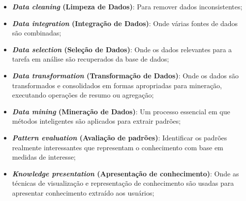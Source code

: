 \begin{itemize}
    \item \textbf{\textit{Data cleaning} (Limpeza de Dados)}: Para remover dados inconsistentes;

    \item \textbf{\textit{Data integration} (Integração de Dados)}: Onde várias fontes de dados são combinadas;

    \item \textbf{\textit{Data selection} (Seleção de Dados)}: Onde os dados relevantes para a tarefa em análise são recuperados da base de dados;

    \item \textbf{\textit{Data transformation} (Transformação de Dados)}: Onde os dados são transformados e consolidados em formas apropriadas para mineração, executando operações de resumo ou agregação;

    \item \textbf{\textit{Data mining} (Mineração de Dados)}: Um processo essencial em que métodos inteligentes são aplicados para extrair padrões;

    \item \textbf{\textit{Pattern evaluation} (Avaliação de padrões)}: Identificar os padrões realmente interessantes que representam o conhecimento com base em medidas de interesse;

    \item \textbf{\textit{Knowledge presentation} (Apresentação de conhecimento)}: Onde as técnicas de visualização e representação de conhecimento são usadas para apresentar conhecimento extraído aos usuários;

\end{itemize}


